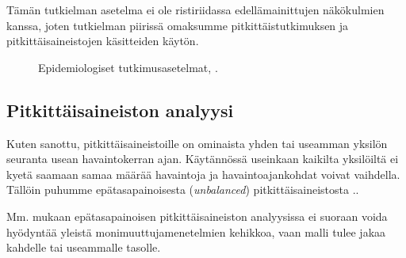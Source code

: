 \documentclass[finnish]{docopts}
\begin{document}
Tämän tutkielman asetelma ei ole ristiriidassa edellämainittujen näkökulmien kanssa, joten tutkielman piirissä omaksumme pitkittäistutkimuksen ja pitkittäisaineistojen käsitteiden käytön. 

\begin{figure}
\centering
{}
\caption{Epidemiologiset tutkimusasetelmat, \cite{twisk13}.}
\label{fig:epikaavio}
\end{figure}

\subsection{Pitkittäisaineiston analyysi}
\label{sub:pitkittaisanal}

Kuten sanottu, pitkittäisaineistoille on ominaista yhden tai useamman yksilön seuranta usean havaintokerran ajan. Käytännössä useinkaan kaikilta yksilöiltä ei kyetä saamaan samaa määrää havaintoja ja havaintoajankohdat voivat vaihdella. Tällöin puhumme epätasapainoisesta (\textit{unbalanced}) pitkittäisaineistosta .\cite{laird82}.

Mm. \cite{verbeke00, goldstein11} mukaan epätasapainoisen pitkittäisaineiston analyysissa ei suoraan voida hyödyntää yleistä monimuuttujamenetelmien kehikkoa, vaan malli tulee jakaa kahdelle tai useammalle tasolle. 
\end{document}

